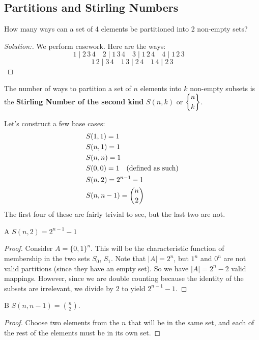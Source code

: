 \label{06-0211}
\subsection{Partitions and Stirling Numbers}
\begin{problem}{1}
How many ways can a set of 4 elements be partitioned into 2 non-empty sets? 
\end{problem}
\begin{proof}[Solution:]
We perform casework. Here are the ways: 
\[
    1 \mid 2 \, 3 \, 4 \quad 
    2 \mid 1 \, 3 \, 4 \quad 
    3 \mid 1 \, 2 \, 4 \quad 
    4 \mid 1\, 2 \, 3 \quad 
\]
\[
    1 \, 2 \mid 3 \, 4 \quad 
    1 \, 3 \mid 2 \, 4 \quad 
    1 \, 4 \mid 2 \, 3
\]
\end{proof}

\begin{definition}
    The number of ways to partition a set of $n$ elements into $k$ non-empty subsets is the \textbf{Stirling Number of the second kind} $S(n, k)$ 
    or $\dstirii{n}{k}$.
\end{definition}

Let's construct a few base cases: 
\begin{align*}
	&S(1, 1) = 1 \\
	&S(n, 1) = 1 \\
	&S(n, n) = 1 \\
	&S(0, 0) = 1 \text{\quad (defined as such)} \\
	&S(n, 2) = 2^{n-1} - 1 \\
    &S(n, n-1) = \binom n 2
\end{align*}
The first four of these are fairly trivial to see, but the last two are not. 
\begin{proposition}{A}
$S(n, 2) = 2^{n-1} - 1$ 
\end{proposition}
\begin{proof}
Consider $A = \{ 0, 1 \}^n$. This will be the characteristic function of membership in the two sets $S_0$, $S_1$. Note that $|A| = 2^n$, but $1^n$ and $0^n$ are not valid partitions (since they have an empty set). So we have $|A| = 2^n - 2$ valid mappings. However, since we are double counting because the identity of the subsets are irrelevant, we divide by 2 to yield $2^{n-1} - 1$. 
\end{proof}
\begin{proposition}{B}
$S(n, n-1) = \binom{n}{2}$. 
\end{proposition}
\begin{proof}
Choose two elements from the $n$ that will be in the same set, and each of the rest of the elements must be in its own set. 
\end{proof}

